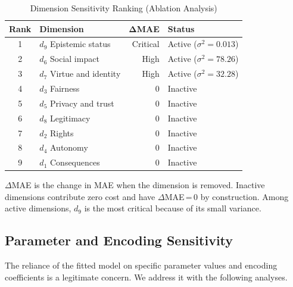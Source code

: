 \documentclass[journal]{IEEEtran}
\begin{document}
\begin{table}[!t]
\renewcommand{\arraystretch}{1.15}
\caption{Dimension Sensitivity Ranking (Ablation Analysis)}
\label{tab:sensitivity}
\centering
\begin{tabular}{c l r l}
\toprule
\textbf{Rank} & \textbf{Dimension} & $\boldsymbol{\Delta}$\textbf{MAE} & \textbf{Status} \\
\midrule
1 & $d_9$ Epistemic status   & Critical & Active ($\sigma^2=0.013$) \\
2 & $d_6$ Social impact      & High     & Active ($\sigma^2=78.26$) \\
3 & $d_7$ Virtue and identity & High    & Active ($\sigma^2=32.28$) \\
4 & $d_3$ Fairness           & 0        & Inactive \\
5 & $d_5$ Privacy and trust  & 0        & Inactive \\
6 & $d_8$ Legitimacy         & 0        & Inactive \\
7 & $d_2$ Rights             & 0        & Inactive \\
8 & $d_4$ Autonomy           & 0        & Inactive \\
9 & $d_1$ Consequences       & 0        & Inactive \\
\bottomrule
\end{tabular}
\begin{flushleft}
\footnotesize{$\Delta$MAE is the change in MAE when the dimension is removed. Inactive dimensions contribute zero cost and have $\Delta$MAE\,=\,0 by construction. Among active dimensions, $d_9$ is the most critical because of its small variance.}
\end{flushleft}
\end{table}

\subsection{Parameter and Encoding Sensitivity}
\label{sec:sensitivity}

The reliance of the fitted model on specific parameter values and encoding coefficients is a legitimate concern.
We address it with the following analyses.
\end{document}
